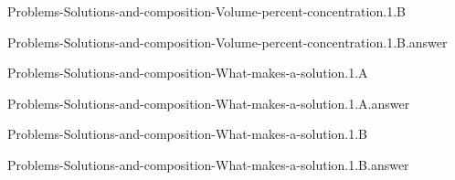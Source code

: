 \documentclass[main.tex]{subfiles}
\newcommand\chapterlabel{}
\begin{document}
\renewcommand\chapterlabel{Ch-electrolytes}
\begin{question}[ID=\the\value{numA}]
{Problems-Solutions-and-composition-Volume-percent-concentration.1.B}
\end{question}
   \begin{Form}
   \TextField[multiline,backgroundcolor=gray!20,borderwidth=0,width=0.43\textwidth  ,height=115pt, name=\the\value{numA}]  { }\end{Form}
\begin{solution}
{Problems-Solutions-and-composition-Volume-percent-concentration.1.B.answer}
\hspace{0.1cm}
\end{solution}


\renewcommand\chapterlabel{Ch-electrolytes}
\begin{question}[ID=\the\value{numA}]
{Problems-Solutions-and-composition-What-makes-a-solution.1.A}
\end{question}
   \begin{Form}
   \TextField[multiline,backgroundcolor=gray!20,borderwidth=0,width=0.43\textwidth  ,height=115pt, name=\the\value{numA}]  { }\end{Form}
\begin{solution}
{Problems-Solutions-and-composition-What-makes-a-solution.1.A.answer}
\hspace{0.1cm}
\end{solution}


\renewcommand\chapterlabel{Ch-electrolytes}
\begin{question}[ID=\the\value{numA}]
{Problems-Solutions-and-composition-What-makes-a-solution.1.B}
\end{question}
   \begin{Form}
   \TextField[multiline,backgroundcolor=gray!20,borderwidth=0,width=0.43\textwidth  ,height=115pt, name=\the\value{numA}]  { }\end{Form}
\begin{solution}
{Problems-Solutions-and-composition-What-makes-a-solution.1.B.answer}
\hspace{0.1cm}
\end{solution}
\end{document}
